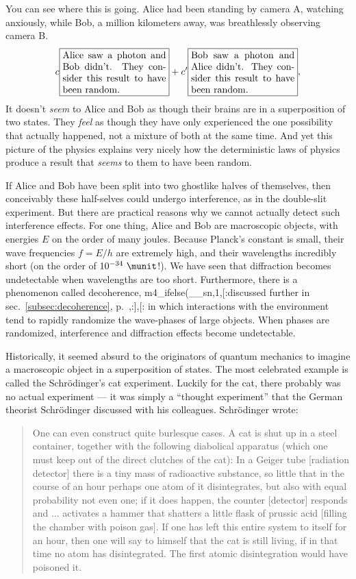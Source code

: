 You can see where this is going.  Alice had been standing by camera A,
watching anxiously, while Bob, a million kilometers away, was
breathlessly observing camera B. 
\begin{equation*}
 c\fbox{\parbox{38mm}{Alice saw a photon and Bob didn't. They consider this result to have been random.}}
+c'\fbox{\parbox{38mm}{Bob saw a photon and Alice didn't. They consider this result to have been random.}},
\end{equation*}
It doesn't \emph{seem} to Alice and Bob as though their brains are in
a superposition of two states. They \emph{feel} as though they have only
experienced the one possibility that actually happened, not a mixture of
both at the same time. And yet this picture of the physics explains very nicely
how the deterministic laws of physics produce a result that \emph{seems}
to them to have been random.

If Alice and Bob have been split into two ghostlike halves of
themselves, then conceivably these half-selves could undergo
interference, as in the double-slit experiment. But there are
practical reasons why we cannot actually detect such interference
effects. For one thing, Alice and Bob are macroscopic objects, with
energies $E$ on the order of many joules. Because Planck's constant is
small, their wave frequencies $f=E/h$ are extremely high, and their
wavelengths incredibly short (on the order of $10^{-34}\ \munit$!). We
have seen that diffraction becomes undetectable when wavelengths are
too short.  Furthermore, there is a phenomenon called decoherence,\label{decoherence-brief}
m4_ifelse(__sn,1,[:discussed further in sec.~\ref{subsec:decoherence}, p.~\pageref{subsec:decoherence},:],[:%
in which interactions with the environment tend to rapidly randomize
the wave-phases of large objects. When phases are randomized,
interference and diffraction effects become undetectable. 

Historically, it seemed absurd to the originators of quantum mechanics
to imagine a macroscopic object in a superposition of states.
The most celebrated example is called the Schr\"odinger's cat\label{schrodingers-cat}
experiment. Luckily for the cat, there probably was no
actual experiment --- it was simply a ``thought experiment''
that the German theorist Schr\"odinger discussed
with his colleagues. Schr\"odinger wrote:

\begin{quote}
One can even construct quite burlesque cases. A cat is shut
up in a steel container, together with the following
diabolical apparatus (which one must keep out of the direct
clutches of the cat): In a Geiger tube [radiation detector]
there is a tiny mass of radioactive substance, so little
that in the course of an hour perhaps one atom of it
disintegrates, but also with equal probability not even one;
if it does happen, the counter [detector] responds and ...
activates a hammer that shatters a little flask of prussic
acid [filling the chamber with poison gas]. If one has left
this entire system to itself for an hour, then one will say
to himself that the cat is still living, if in that time no
atom has disintegrated. The first atomic disintegration
would have poisoned it.
\end{quote}

